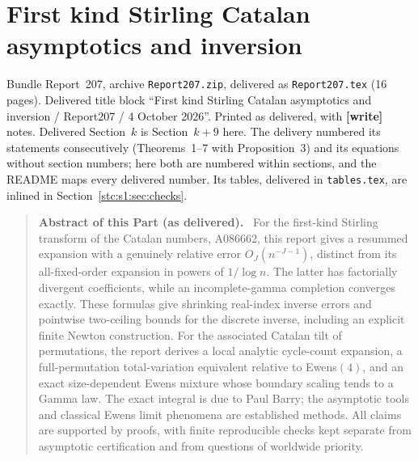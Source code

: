\documentclass[11pt,letterpaper]{article}
\numberwithin{equation}{section}
\theoremstyle{remark}\newtheorem{remark}[theorem]{Remark}
\newcommand{\file}[1]{\nolinkurl{#1}}
\newenvironment{partabstract}{\begin{quote}\small\noindent\textbf{Abstract of this Part (as delivered).}\ }{\end{quote}}
\newcommand{\partsource}[1]{\par\noindent\begin{minipage}{\textwidth}\small #1\end{minipage}\par\medskip}
\begin{document}
\clearpage
\part{First kind Stirling Catalan asymptotics and inversion}\label{stc:s1:part}
\partsource{Bundle Report~207, archive \file{Report207.zip}, delivered as \file{Report207.tex} (16 pages). Delivered title block ``First kind Stirling Catalan asymptotics and inversion / Report207 / 4 October 2026''. Printed as delivered, with \textbf{[write]} notes. Delivered Section~$k$ is Section~$k+9$ here. The delivery numbered its statements consecutively (Theorems~1--7 with Proposition~3) and its equations without section numbers; here both are numbered within sections, and the README maps every delivered number. Its tables, delivered in \file{tables.tex}, are inlined in Section~\ref{stc:s1:sec:checks}.}
\begin{partabstract}
For the first-kind Stirling transform of the Catalan numbers, A086662, this report gives a resummed expansion with a genuinely relative error $O_J(n^{-J-1})$, distinct from its all-fixed-order expansion in powers of $1/\log n$. The latter has factorially divergent coefficients, while an incomplete-gamma completion converges exactly. These formulas give shrinking real-index inverse errors and pointwise two-ceiling bounds for the discrete inverse, including an explicit finite Newton construction. For the associated Catalan tilt of permutations, the report derives a local analytic cycle-count expansion, a full-permutation total-variation equivalent relative to Ewens$(4)$, and an exact size-dependent Ewens mixture whose boundary scaling tends to a Gamma law. The exact integral is due to Paul Barry; the asymptotic tools and classical Ewens limit phenomena are established methods. All claims are supported by proofs, with finite reproducible checks kept separate from asymptotic certification and from questions of worldwide priority.
\end{partabstract}
\end{document}

